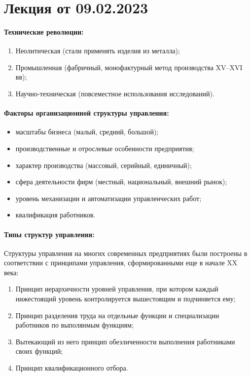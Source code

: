 
\section{Лекция от 09.02.2023}
\paragraph{Технические революции:}\mbox{}\par
\begin{enumerate}
  \item Неолитическая (стали применять изделия из металла);
  \item Промышленная (фабричный, монофактурный метод производства XV--XVI\,вв);
  \item Научно-техническая (повсеместное использования исследований).
\end{enumerate}

\paragraph{Факторы организационной структуры управления:}\mbox{}\par
\begin{itemize}
  \item масштабы бизнеса (малый, средний, большой);
  \item производственные и отрослевые особенности предприятия;
  \item характер производства (массовый, серийный, единичный);
  \item сфера деятельности фирм (местный, национальный, внешний рынок);
  \item уровень механизации и автоматизации управленческих работ;
  \item квалификация работников.
\end{itemize}

\paragraph{Типы структур управления:}\mbox{}\par
Структуры управления на многих современных предприятиях были построены в
соответствии с принципами управления, сформированными еще в начале XX века:
\begin{enumerate}
  \item Принцип иерархичности уровней управления, при котором каждый
    нижестоящий уровень контролируется вышестоящим и подчиняется ему;
  \item Принцип разделения труда на отдельные функции и специализации
    работников по выполянмым функциям;
  \item Вытекающий из него принцип обезличенности выполнения работниками
    своих функций;
  \item Принцип квалификационного отбора.
\end{enumerate}


